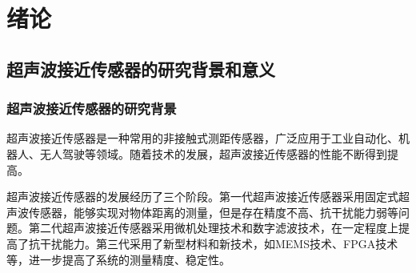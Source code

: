 	\newpage
	\section{绪论}
    \subsection{超声波接近传感器的研究背景和意义}
    \subsubsection{超声波接近传感器的研究背景}
    超声波接近传感器是一种常用的非接触式测距传感器，广泛应用于工业自动化、机器人、无人驾驶等领域。随着技术的发展，超声波接近传感器的性能不断得到提高。\par    
    超声波接近传感器的发展经历了三个阶段。第一代超声波接近传感器采用固定式超声波传感器，能够实现对物体距离的测量，但是存在精度不高、抗干扰能力弱等问题。第二代超声波接近传感器采用微机处理技术和数字滤波技术，在一定程度上提高了抗干扰能力。第三代采用了新型材料和新技术，如MEMS技术、FPGA技术等，进一步提高了系统的测量精度、稳定性。
%	
%	
%	
%		

